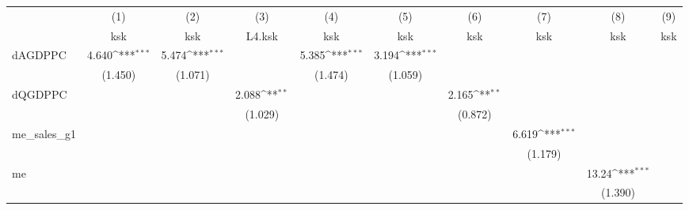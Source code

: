 {
\def\sym#1{\ifmmode^{#1}\else\(^{#1}\)\fi}
\begin{tabular}{l*{9}{c}}
\hline\hline
            &\multicolumn{1}{c}{(1)}&\multicolumn{1}{c}{(2)}&\multicolumn{1}{c}{(3)}&\multicolumn{1}{c}{(4)}&\multicolumn{1}{c}{(5)}&\multicolumn{1}{c}{(6)}&\multicolumn{1}{c}{(7)}&\multicolumn{1}{c}{(8)}&\multicolumn{1}{c}{(9)}\\
            &\multicolumn{1}{c}{ksk}&\multicolumn{1}{c}{ksk}&\multicolumn{1}{c}{L4.ksk}&\multicolumn{1}{c}{ksk}&\multicolumn{1}{c}{ksk}&\multicolumn{1}{c}{ksk}&\multicolumn{1}{c}{ksk}&\multicolumn{1}{c}{ksk}&\multicolumn{1}{c}{ksk}\\
\hline
dAGDPPC     &       4.640\sym{***}&       5.474\sym{***}&                     &       5.385\sym{***}&       3.194\sym{***}&                     &                     &                     &                     \\
            &     (1.450)         &     (1.071)         &                     &     (1.474)         &     (1.059)         &                     &                     &                     &                     \\
[1em]
dQGDPPC     &                     &                     &       2.088\sym{**} &                     &                     &       2.165\sym{**} &                     &                     &                     \\
            &                     &                     &     (1.029)         &                     &                     &     (0.872)         &                     &                     &                     \\
[1em]
me\_sales\_g1 &                     &                     &                     &                     &                     &                     &       6.619\sym{***}&                     &                     \\
            &                     &                     &                     &                     &                     &                     &     (1.179)         &                     &                     \\
[1em]
me          &                     &                     &                     &                     &                     &                     &                     &       13.24\sym{***}&                     \\
            &                     &                     &                     &                     &                     &                     &                     &     (1.390)         &                     \\

\end{tabular}}
